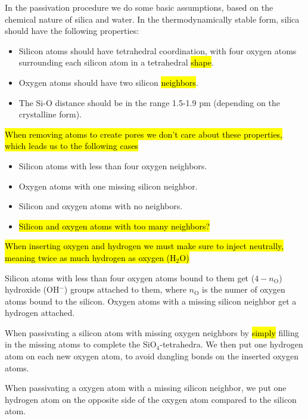 In the passivation procedure we do some basic assumptions, based on the chemical nature of silica and water. In the thermodynamically stable form, silica should have the following properties:
\begin{itemize}
    \item Silicon atoms should have tetrahedral coordination, with four oxygen atoms surrounding each silicon atom in a tetrahedral \hl{shape}. 
    \item Oxygen atoms should have two silicon \hl{neighbors}.
    \item The Si-O distance should be in the range 1.5-1.9 pm (depending on the crystalline form).
\end{itemize}

\hl{When removing atoms to create pores we don't care about these properties, which leads us to the following cases}
\begin{itemize}
    \item Silicon atoms with less than four oxygen neighbors.
    \item Oxygen atoms with one missing silicon neighbor.
    \item Silicon and oxygen atoms with no neighbors.
    \item \hl{Silicon and oxygen atoms with too many neighbors?}
\end{itemize}

\hl{When inserting oxygen and hydrogen we must make sure to inject neutrally, meaning twice as much hydrogen as oxygen (H$_2$O)}

Silicon atoms with less than four oxygen atoms bound to them get ($4-n_\text{O}$) hydroxide (OH$^-$) groups attached to them, where $n_\text{O}$ is the numer of oxygen atoms bound to the silicon. Oxygen atoms with a missing silicon neighbor get a hydrogen attached. 

When passivating a silicon atom with missing oxygen neighbors by \hl{simply} filling in the missing atoms to complete the SiO$_4$-tetrahedra. We then put one hydrogen atom on each new oxygen atom, to avoid dangling bonds on the inserted oxygen atoms.

When passivating a oxygen atom with a missing silicon neighbor, we put one hydrogen atom on the opposite side of the oxygen atom compared to the silicon atom.

